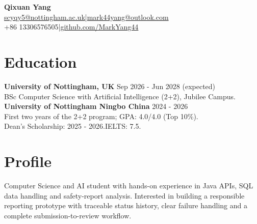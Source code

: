 \documentclass[11pt,a4paper]{article}
\begin{document}
\begin{center}
{\LARGE\bfseries\color{navy} Qixuan Yang}\\[3pt]
{\small\href{mailto:scyqy5@nottingham.ac.uk}{scyqy5@nottingham.ac.uk}\enspace|\enspace\href{mailto:mark44yang@outlook.com}{mark44yang@outlook.com}\\[2pt]
+86 13306576505\enspace|\enspace\href{https://github.com/MarkYang44}{github.com/MarkYang44}}
\end{center}
\section*{Education}
\textbf{University of Nottingham, UK} \hfill Sep 2026 - Jun 2028 (expected)\\
BSc Computer Science with Artificial Intelligence (2+2), Jubilee Campus.\\[2pt]
\textbf{University of Nottingham Ningbo China} \hfill 2024 - 2026\\
First two years of the 2+2 program; GPA: 4.0/4.0 (Top 10\%).\\
Dean's Scholarship: 2025 - 2026.\quad IELTS: 7.5.

\section*{Profile}
Computer Science and AI student with hands-on experience in Java APIs, SQL data handling and safety-report analysis. Interested in building a responsible reporting prototype with traceable status history, clear failure handling and a complete submission-to-review workflow.
\end{document}
